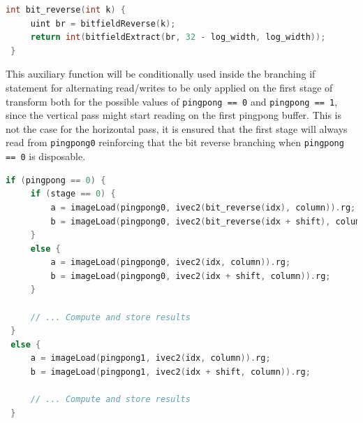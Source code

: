 \documentclass[
  oneside,
  11pt, a4paper,
  footinclude=true,
  headinclude=true,
  cleardoublepage=empty
]{scrbook}
\begin{document}
\begin{lstlisting}[language=C,caption={Auxiliary function that takes advantage of GLSL's predefined utilities}]
 int bit_reverse(int k) {
     uint br = bitfieldReverse(k);
     return int(bitfieldExtract(br, 32 - log_width, log_width));
 }
\end{lstlisting}

This auxiliary function will be conditionally used inside the branching if statement for alternating read/writes to be only applied on the first stage of transform both for the possible values of \texttt{pingpong == 0} and \texttt{pingpong == 1}, since the vertical pass might start reading on the first pingpong buffer. This is not the case for the horizontal pass, it is ensured that the first stage will always read from \texttt{pingpong0} reinforcing that the bit reverse branching when \texttt{pingpong == 0} is disposable.

\begin{lstlisting}[language=C,caption={Computation of the Cooley-Tukey butterfly with bit reversal}]
 if (pingpong == 0) {
     if (stage == 0) {
         a = imageLoad(pingpong0, ivec2(bit_reverse(idx), column)).rg;
         b = imageLoad(pingpong0, ivec2(bit_reverse(idx + shift), column)).rg;
     }
     else {
         a = imageLoad(pingpong0, ivec2(idx, column)).rg;
         b = imageLoad(pingpong0, ivec2(idx + shift, column)).rg;
     }

     // ... Compute and store results
 }
 else {
     a = imageLoad(pingpong1, ivec2(idx, column)).rg;
     b = imageLoad(pingpong1, ivec2(idx + shift, column)).rg;

     // ... Compute and store results
 }
\end{lstlisting}



\end{document}
